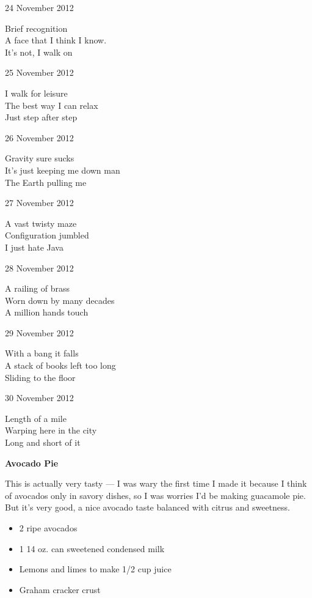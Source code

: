 \documentclass[12pt]{article}
\begin{document}
24 November 2012

Brief recognition \\
A face that I think I know. \\
It's not, I walk on

25 November 2012

I walk for leisure \\
The best way I can relax \\
Just step after step

26 November 2012

Gravity sure sucks \\
It's just keeping me down man \\
The Earth pulling me

27 November 2012

A vast twisty maze \\
Configuration jumbled \\
I just hate Java

28 November 2012

A railing of brass \\
Worn down by many decades \\
A million hands touch

29 November 2012

With a bang it falls \\
A stack of books left too long \\
Sliding to the floor

30 November 2012

Length of a mile \\
Warping here in the city \\
Long and short of it

\newpage

\begin{center}
{\bfseries Avocado Pie}
\end{center}

This is actually very tasty --- I was wary the first time I made it 
because I think of avocados only in savory dishes, so I was worries
I'd be making guacamole pie. But it's very good, a nice avocado taste
balanced with citrus and sweetness.

\begin{itemize}
    \item 2 ripe avocados
    \item 1 14 oz. can sweetened condensed milk
    \item Lemons and limes to make 1/2 cup juice
    \item Graham cracker crust
\end{itemize}
\end{document}
